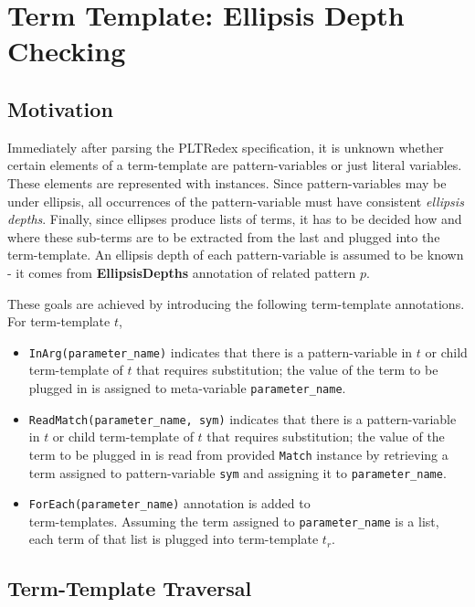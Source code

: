 \section{Term Template: Ellipsis Depth Checking}

\subsection{Motivation}

Immediately after parsing the PLTRedex specification, it is unknown whether certain elements of a term-template are pattern-variables or just literal variables. These elements are represented with \UnresolvedSymbol \space instances. Since pattern-variables may be under ellipsis, all occurrences of the pattern-variable must have consistent \textit{ellipsis depths}. Finally, since ellipses produce lists of terms, it has to be decided how and where these sub-terms are to be extracted from the last and plugged into the term-template. An ellipsis depth of each pattern-variable is assumed to be known - it comes from \textbf{EllipsisDepths} annotation of related pattern $p$.

These goals are achieved by introducing the following term-template annotations. For term-template $t$,

\begin{itemize}
\item
\texttt{InArg(parameter\_name)} indicates that there is a pattern-variable in $t$ or child term-template of $t$ that requires substitution; the value of the term to be plugged in is assigned to meta-variable \texttt{parameter\_name}.
\item
\texttt{ReadMatch(parameter\_name, sym)} indicates that there is a pattern-variable in $t$ or child term-template of $t$ that requires substitution; the value of the term to be plugged in is read from provided \texttt{Match} instance by retrieving a term assigned to pattern-variable \texttt{sym} and assigning it to \texttt{parameter\_name}.
\item
\texttt{ForEach(parameter\_name)} annotation is added to \TermRepeat \\ term-templates. Assuming the term assigned to \texttt{parameter\_name} is a list, each term of that list is plugged into term-template $t_r$.
\end{itemize}

\subsection{Term-Template Traversal}

